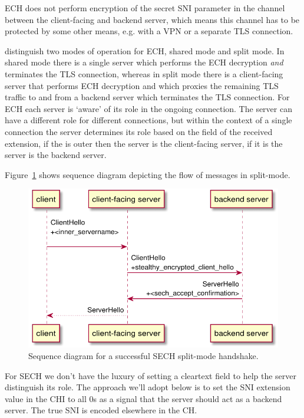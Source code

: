 \ac{ECH} does not perform encryption of the secret \ac{SNI} parameter in the channel between
the client-facing and backend server,
which means this channel has to be protected
by some other means,
e.g. with a \ac{VPN} or a separate \ac{TLS} connection.

\cite{esni} distinguish two modes of operation for \ac{ECH}, shared mode and split mode.
In shared mode there is a single server which performs the \ac{ECH} decryption {\em and} terminates the \ac{TLS} connection,
whereas in split mode there is a client-facing server that performs \ac{ECH} decryption and which proxies the remaining \ac{TLS} traffic to and from a backend server which terminates the \ac{TLS} connection.
For \ac{ECH} each server is `aware' of its role in the ongoing connection.
The server can have a different role for different connections,
but within the context of a single connection the server determines its role based on the  field of the received  extension,
if the  is outer then the server is the client-facing server,
if it is  the server is the backend server.

Figure~\ref{fig:sech-split-mode-accept} shows sequence diagram depicting the flow of messages in split-mode.

\begin{figure}[htb]
\centering
\includegraphics[width=\linewidth]{figure/sech-split-mode-accept.pdf}
\captionsetup{width=.8\linewidth} 
\caption[]{Sequence diagram for a successful SECH split-mode handshake.}
\label{fig:sech-split-mode-accept}
\end{figure}

For \ac{SECH} we don't have the luxury of setting
a cleartext  field to help the server
distinguish its role.
The approach we'll adopt below is to set the \ac{SNI} extension value in the \ac{CHI} to all 0s
as a signal that the server should act as a backend server.
The true \ac{SNI} is encoded elsewhere in the \ac{CH}.

